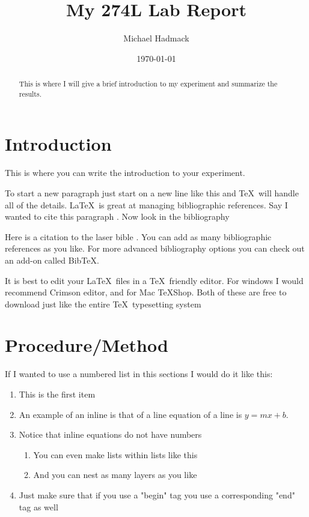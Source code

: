 \documentclass[10pt]{article}
\title{My 274L Lab Report}
\author{Michael Hadmack}
\date{\today}
\begin{document}
\maketitle


\begin{abstract}
	This is where I will give a brief introduction to my experiment and summarize the results.
\end{abstract}

\section{Introduction} \label{sec:intro}
This is where you can write the introduction to your experiment.

To start a new paragraph just start on a new line like this and \TeX~will handle all of the details.  \LaTeX~is great at managing bibliographic references.  Say I wanted to cite this paragraph \cite{somesource}.  Now look in the bibliography

Here is a citation to the laser bible \cite{siegman1986l}.  You can add as many bibliographic references as you like.  For more advanced bibliography options you can check out an add-on called Bib\TeX.

It is best to edit your \LaTeX~files in a \TeX~friendly editor.  For windows I would recommend Crimson editor, and for Mac \TeX Shop.  Both of these are free to download just like the entire \TeX~typesetting system

\section{Procedure/Method} \label{sec:procedure}
If I wanted to use a numbered list in this sections I would do it like this:
\begin{enumerate}
	\item This is the first item
	\item An example of an inline is that of a line equation of a line is $y=m x + b$.
	\item Notice that inline equations do not have numbers
	\begin{enumerate}
		\item You can even make lists within lists like this
		\item And you can nest as many layers as you like
	\end{enumerate}
	\item Just make sure that if you use a "begin" tag you use a corresponding "end" tag as well
\end{enumerate}
\end{document}
